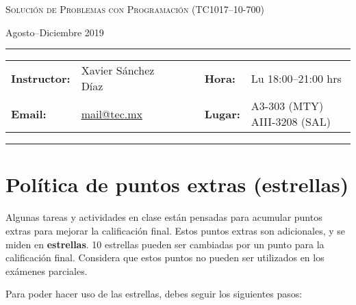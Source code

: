 \documentclass[12pt, letterpaper, oneside]{article}
\makeatletter
\newcommand{\thecourse}{Solución de Problemas con Programación (TC1017--10-700)}
\newcommand{\thesemester}{Agosto--Diciembre 2019}
\newcommand{\theinstructor}{Xavier Sánchez Díaz}
\newcommand{\themail}{mail@tec.mx}
\newcommand{\thetime}{Lu 18:00--21:00 hrs}
\newcommand{\theplace}{\scriptsize A3-303 (MTY) AIII-3208 (SAL)}
\makeatother
\begin{document}
  \begin{center}
  {\Large \textsc{\thecourse}}
  \end{center}
  \begin{center}
  \thesemester
  \end{center}

  \begin{center}
  \rule{6in}{0.4pt}
  \begin{minipage}[t]{.75\textwidth}
  \begin{tabular}{llcccll}
  \textbf{Instructor:} & \theinstructor & & &  & \textbf{Hora:} & \thetime \\
  \textbf{Email:} &  \href{mailto:mail@tec.mx}{\themail} & & & & \textbf{Lugar:} & \theplace
  \end{tabular}
  \end{minipage}
  \rule{6in}{0.4pt}
  \end{center}
  \vspace{.5cm}
  \setlength{\unitlength}{1in}
  \renewcommand{\arraystretch}{2}

  \section{Política de puntos extras (estrellas)}

  Algunas tareas y actividades en clase están pensadas para acumular puntos extras para mejorar la calificación final.
  Estos puntos extras son adicionales, y se miden en \textbf{estrellas}.
  10 estrellas pueden ser cambiadas por un punto para la calificación final.
  Considera que estos puntos no pueden ser utilizados en los exámenes parciales.

  Para poder hacer uso de las estrellas, debes seguir los siguientes pasos:
\end{document}
